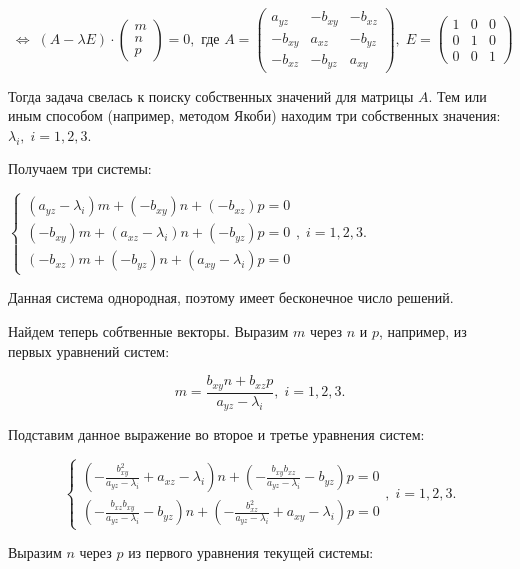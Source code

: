 $$\; \Leftrightarrow \; (A - \lambda E)\cdot \begin{pmatrix}
	m \\ n \\ p
\end{pmatrix} = 0,\text{ где } A = \begin{pmatrix}
	a_{yz}  & -b_{xy} & -b_{xz} \\
	-b_{xy} & a_{xz} & -b_{yz} \\
	-b_{xz} & -b_{yz} & a_{xy}
\end{pmatrix}, \; E = \begin{pmatrix}
	1 & 0 & 0 \\
	0 & 1 & 0 \\
	0 & 0 & 1
\end{pmatrix}$$

Тогда задача свелась к поиску собственных значений для матрицы $A$. Тем или иным способом (например, методом Якоби) находим три собственных значения: $\lambda_i,\;i=1,2,3$.

Получаем три системы:

\begin{center}
	$\begin{cases}
		(a_{yz} - \lambda_i ) m + (-b_{xy}) n + (-b_{xz}) p = 0 \\
		(-b_{xy})m + (a_{xz} - \lambda_i)n + (-b_{yz})p = 0 \\
		(-b_{xz})m + (-b_{yz})n + (a_{xy} - \lambda_i)p = 0
	\end{cases}, \; i = 1,2,3$.
\end{center}

Данная система однородная, поэтому имеет бесконечное число решений.

Найдем теперь собтвенные векторы. Выразим $m$ через $n$ и $p$, например, из первых уравнений систем:

$$m = \frac{b_{xy} n + b_{xz} p }{a_{yz} - \lambda_i}, \; i = 1,2,3.$$

Подставим данное выражение во второе и третье уравнения систем:

$$\begin{cases}
	(- \frac{b_{xy}^2}{a_{yz} - \lambda_i} + a_{xz} - \lambda_i) n + (-\frac{b_{xy} b_{xz}}{a_{yz} - \lambda_i} - b_{yz})p = 0 \\
	(-\frac{b_{xz} b_{xy}}{a_{yz} - \lambda_i} - b_{yz}) n + (- \frac{b_{xz}^2}{a_{yz} - \lambda_i} + a_{xy} - \lambda_i) p = 0
\end{cases}, \; i = 1,2,3.$$

Выразим $n$ через $p$ из первого уравнения текущей системы:

